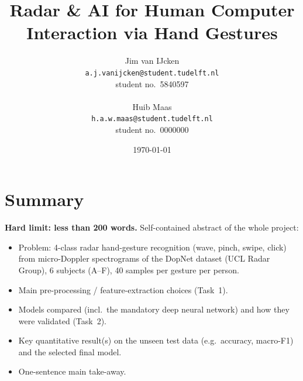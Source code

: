 \documentclass[10pt,a4paper,titlepage]{article}
\title{Radar \& AI for Human Computer Interaction via Hand Gestures}
\author{%
Jim van IJcken \\ \texttt{a.j.vanijcken@student.tudelft.nl}\\ student no.\ 5840597\\\\
Huib Maas \\ \texttt{h.a.w.maas@student.tudelft.nl}\\ student no.\ 0000000}
\date{\today}
\newcommand{\placeholder}[1]{\begin{placeholderbox}#1\end{placeholderbox}}
\begin{document}
\maketitle

\section*{Summary}
\placeholder{%
\textbf{Hard limit: less than 200 words.} Self-contained abstract of the whole
project:
\begin{itemize}
  \item Problem: 4-class radar hand-gesture recognition (wave, pinch, swipe,
        click) from micro-Doppler spectrograms of the DopNet dataset (UCL Radar
        Group), 6 subjects (A--F), 40 samples per gesture per person.
  \item Main pre-processing / feature-extraction choices (Task~1).
  \item Models compared (incl.\ the mandatory deep neural network) and how they
        were validated (Task~2).
  \item Key quantitative result(s) on the unseen test data (e.g.\ accuracy,
        macro-F1) and the selected final model.
  \item One-sentence main take-away.
\end{itemize}}

\end{document}
